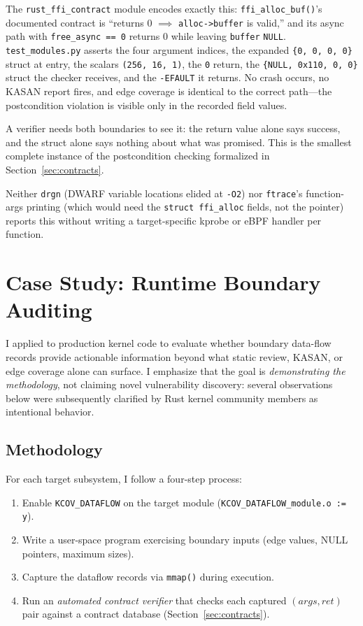 \documentclass{article}
\begin{document}
The \texttt{rust\_ffi\_contract} module encodes exactly this:
\texttt{ffi\_alloc\_buf()}'s documented contract is ``returns 0 $\implies$
\texttt{alloc->buffer} is valid,'' and its async path with
\texttt{free\_async == 0} returns 0 while leaving \texttt{buffer} \texttt{NULL}.
\texttt{test\_modules.py} asserts the four argument indices, the expanded
\texttt{\{0, 0, 0, 0\}} struct at entry, the scalars \texttt{(256, 16, 1)}, the
\texttt{0} return, the \texttt{\{NULL, 0x110, 0, 0\}} struct the checker
receives, and the \texttt{-EFAULT} it returns. No crash occurs, no KASAN report
fires, and edge coverage is identical to the correct path---the postcondition
violation is visible only in the recorded field values.

A verifier needs both boundaries to see it: the return value alone says
success, and the struct alone says nothing about what was promised. This is the
smallest complete instance of the postcondition checking formalized in
Section~\ref{sec:contracts}.

Neither \texttt{drgn} (DWARF variable locations elided at \texttt{-O2}) nor
\texttt{ftrace}'s function-args printing (which would need the
\texttt{struct ffi\_alloc} fields, not the pointer) reports this without
writing a target-specific kprobe or eBPF handler per function.


\section{Case Study: Runtime Boundary Auditing}\label{sec:realworld}

I applied \toolname{} to production kernel code to evaluate whether
boundary data-flow records provide actionable information beyond what
static review, KASAN, or edge coverage alone can surface.
I emphasize that the goal is \emph{demonstrating the methodology},
not claiming novel vulnerability discovery: several observations below
were subsequently clarified by Rust kernel community members as intentional behavior.

\subsection{Methodology}

For each target subsystem, I follow a four-step process:
\begin{enumerate}[nosep]
  \item Enable \texttt{KCOV\_DATAFLOW} on the target module
        (\texttt{KCOV\_DATAFLOW\_module.o := y}).
  \item Write a user-space program exercising boundary inputs (edge values,
        NULL pointers, maximum sizes).
  \item Capture the dataflow records via \texttt{mmap()} during execution.
  \item Run an \emph{automated contract verifier} that checks each captured
        $(\mathit{args}, \mathit{ret})$ pair against a contract database
        (Section~\ref{sec:contracts}).
\end{enumerate}
\end{document}
